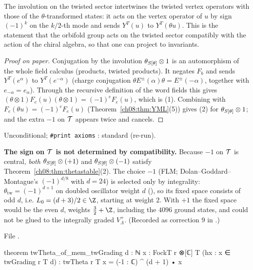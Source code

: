 \begin{physics}
The involution on the twisted sector intertwines the twisted vertex operators with those of the $\theta$-transformed states: it acts on the vertex operator of $u$ by sign $(-1)^k$ on the $k/2$-th mode and sends $Y^T(u)$ to $Y^T(\theta u)$. This is the statement that the orbifold group acts on the twisted sector compatibly with the action of the chiral algebra, so that one can project to invariants.
\end{physics}
\begin{proof}[Proof on paper]
Conjugation by the involution $\theta_{S[\theta]}\otimes1$ is an automorphism of the whole field
calculus (products, twisted products).  It negates $F_b$ and sends $Y^T(e^\alpha)$ to $Y^T(e^{-\alpha})$
(charge conjugation $\theta E^\pm(\alpha)\theta=E^\pm(-\alpha)$, together with $e_{-\alpha}=e_\alpha$).
Through the recursive definition of the word fields this gives
$(\theta\otimes1)F_e(u)(\theta\otimes1)=(-1)^eF_e(u)$, which is (1).  Combining with
$F_e(\theta u)=(-1)^eF_e(u)$ (Theorem~\ref{ch08:thm:YML}(5)) gives (2) for $\theta_{S[\theta]}\otimes1$;
and the extra $-1$ on $\mathcal{T}$ appears twice and cancels.
\end{proof}
\begin{status}
Unconditional; \texttt{\#print axioms} : standard (re-run).
\end{status}
\begin{warning}
\textbf{The sign on $\mathcal{T}$ is not determined by compatibility.}  Because $-1$ on $\mathcal{T}$ is
central, \emph{both} $\theta_{S[\theta]}\otimes(+1)$ and $\theta_{S[\theta]}\otimes(-1)$ satisfy
Theorem~\ref{ch08:thm:thetastable}(2).  The choice $-1$ (FLM; Dolan--Goddard--Montague's
$(-1)^{d/8}$ with $d=24$) is selected only by integrality: $\theta_{\mathrm{tw}}=(-1)^{d+1}$ on
doubled oscillator weight $d$ (), so its fixed space consists of odd
$d$, i.e. $L_0=(d+3)/2\in\Z$, starting at weight $2$.  With $+1$ the fixed space would be the even
$d$, weights $\frac32+\Z$, including the $4096$ ground states, and could not be glued to the
integrally graded $V_\Lambda^+$.  (Recorded as correction 9 in .)
\end{warning}
\noindent File .
\begin{leancode}
theorem twTheta_of_mem_twGrading {d : ℕ} {x : FockT r ⊗[ℂ] T} (hx : x ∈ twGrading r T d) :
    twTheta r T x = (-1 : ℂ) ^ (d + 1) • x
\end{leancode}

